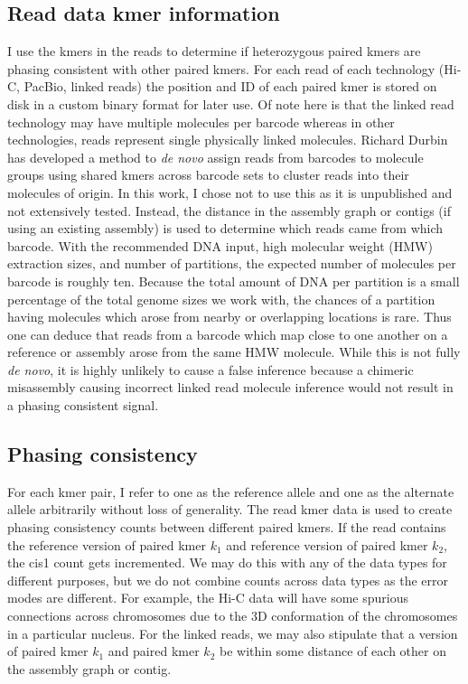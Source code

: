 \subsection{Read data kmer information}
\par{
I use the kmers in the reads to determine if heterozygous paired kmers are phasing consistent with other paired kmers. For each read of each technology (Hi-C, PacBio, linked reads) the position and ID of each paired kmer is stored on disk in a custom binary format for later use. Of note here is that the linked read technology may have multiple molecules per barcode whereas in other technologies, reads represent single physically linked molecules. Richard Durbin has developed a method to \textit{de novo} assign reads from barcodes to molecule groups using shared kmers across barcode sets to cluster reads into their molecules of origin\cite{hash10x}. In this work, I chose not to use this as it is unpublished and not extensively tested. Instead, the distance in the assembly graph or contigs (if using an existing assembly) is used to determine which reads came from which barcode. With the recommended DNA input, high molecular weight (HMW) extraction sizes, and number of partitions, the expected number of molecules per barcode is roughly ten. Because the total amount of DNA per partition is a small percentage of the total genome sizes we work with, the chances of a partition having molecules which arose from nearby or overlapping locations is rare. Thus one can deduce that reads from a barcode which map close to one another on a reference or assembly arose from the same HMW molecule. While this is not fully \textit{de novo}, it is highly unlikely to cause a false inference because a chimeric misassembly causing incorrect linked read molecule inference would not result in a phasing consistent signal.
}

\subsection{Phasing consistency}
\par{
For each kmer pair, I refer to one as the reference allele and one as the alternate allele arbitrarily without loss of generality. The read kmer data is used to create phasing consistency counts between different paired kmers. If the read contains the reference version of paired kmer $k_1$ and reference version of paired kmer $k_2$, the cis1 count gets incremented. We may do this with any of the data types for different purposes, but we do not combine counts across data types as the error modes are different. For example, the Hi-C data will have some spurious connections across chromosomes due to the 3D conformation of the chromosomes in a particular nucleus. For the linked reads, we may also stipulate that a version of paired kmer $k_1$ and paired kmer $k_2$ be within some distance of each other on the assembly graph or contig.
}
